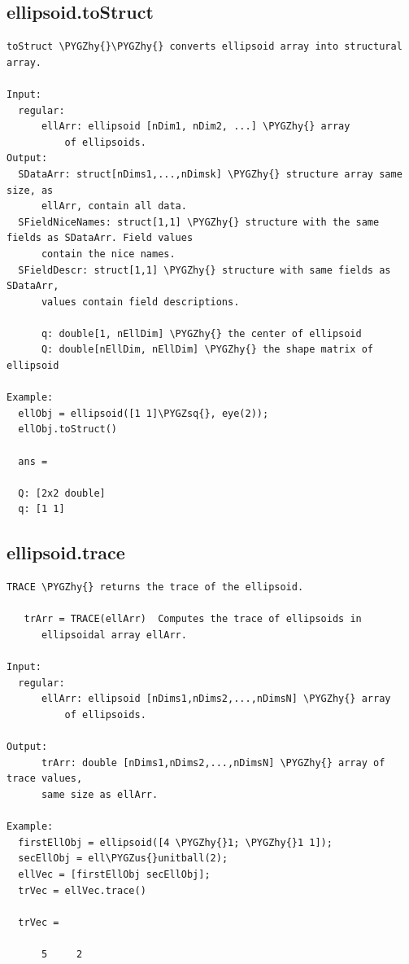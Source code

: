 \documentclass[letterpaper,10pt,english]{sphinxmanual}
\def\PYGZus{\char`\_}
\def\PYGZhy{\char`\-}
\def\PYGZsq{\char`\'}
\begin{document}
\subsection{ellipsoid.toStruct}
\label{chap_functions:ellipsoid-tostruct}
\begin{Verbatim}[commandchars=\\\{\}]
toStruct \PYGZhy{}\PYGZhy{} converts ellipsoid array into structural array.

Input:
  regular:
      ellArr: ellipsoid [nDim1, nDim2, ...] \PYGZhy{} array
          of ellipsoids.
Output:
  SDataArr: struct[nDims1,...,nDimsk] \PYGZhy{} structure array same size, as
      ellArr, contain all data.
  SFieldNiceNames: struct[1,1] \PYGZhy{} structure with the same fields as SDataArr. Field values
      contain the nice names.
  SFieldDescr: struct[1,1] \PYGZhy{} structure with same fields as SDataArr,
      values contain field descriptions.

      q: double[1, nEllDim] \PYGZhy{} the center of ellipsoid
      Q: double[nEllDim, nEllDim] \PYGZhy{} the shape matrix of ellipsoid

Example:
  ellObj = ellipsoid([1 1]\PYGZsq{}, eye(2));
  ellObj.toStruct()

  ans =

  Q: [2x2 double]
  q: [1 1]
\end{Verbatim}


\subsection{ellipsoid.trace}
\label{chap_functions:ellipsoid-trace}
\begin{Verbatim}[commandchars=\\\{\}]
TRACE \PYGZhy{} returns the trace of the ellipsoid.

   trArr = TRACE(ellArr)  Computes the trace of ellipsoids in
      ellipsoidal array ellArr.

Input:
  regular:
      ellArr: ellipsoid [nDims1,nDims2,...,nDimsN] \PYGZhy{} array
          of ellipsoids.

Output:
      trArr: double [nDims1,nDims2,...,nDimsN] \PYGZhy{} array of trace values,
      same size as ellArr.

Example:
  firstEllObj = ellipsoid([4 \PYGZhy{}1; \PYGZhy{}1 1]);
  secEllObj = ell\PYGZus{}unitball(2);
  ellVec = [firstEllObj secEllObj];
  trVec = ellVec.trace()

  trVec =

      5     2
\end{Verbatim}
\end{document}
